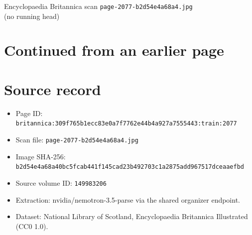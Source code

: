 \documentclass{article}
\begin{document}
\begin{center}
{\Large Encyclopaedia Britannica scan \texttt{page-2077-b2d54e4a68a4.jpg}}\\[0.5em]
(no running head)
\end{center}
\section*{Continued from an earlier page}
\section*{Source record}
\begin{itemize}
\item Page ID: \texttt{britannica:309f765b1ecc83e0a7f7762e44b4a927a7555443:train:2077}
\item Scan file: \texttt{page-2077-b2d54e4a68a4.jpg}
\item Image SHA-256: \texttt{b2d54e4a68a40bc5fcab441f145cad23b492703c1a2875add967517dceaaefbd}
\item Source volume ID: \texttt{149983206}
\item Extraction: nvidia/nemotron-3.5-parse via the shared organizer endpoint.
\item Dataset: National Library of Scotland, Encyclopaedia Britannica Illustrated (CC0 1.0).
\end{itemize}
\end{document}
